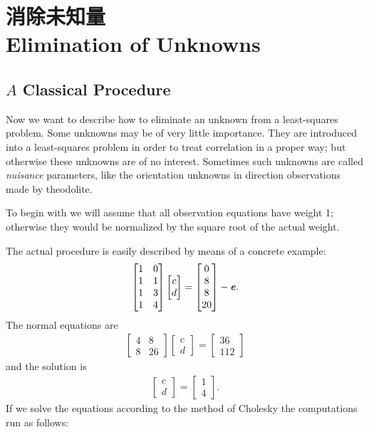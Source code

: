 \section[消除未知量]{消除未知量\\Elimination of Unknowns}
   \subsection{$A$ Classical Procedure}
   
\begin{flushleft}
	Now we want to describe how to eliminate an unknown from a least-squares problem. Some unknowns may be of very little importance. They are introduced into a least-squares problem in order to treat correlation in a proper way; but otherwise these unknowns are of no interest. Sometimes such unknowns are called \textit{nuisance} parameters, like the orientation unknowns in direction observations made by theodolite.
\end{flushleft}

  To begin with we will assume that all observation equations have weight 1; otherwise they would be normalized by the square root of the actual weight.

The actual procedure is easily described by means of a concrete example:
\begin{align}
\begin{bmatrix}
1    &    0\\
1    &    1\\
1    &    3\\
1    &    4
\end{bmatrix}
\begin{bmatrix}
c\\
d
\end{bmatrix}  = 
\begin{bmatrix}
0\\
8\\
8\\
20
\end{bmatrix}
- \textbf{\textit{e}}.
\end{align}
The normal equations are
\begin{align}
\begin{bmatrix}
4  &  8\\
8  &  26
\end{bmatrix}
\begin{bmatrix}
c\\
d
\end{bmatrix} = 
\begin{bmatrix}
36\\
112
\end{bmatrix}
\end{align}
and the solution is
\begin{align*}
\begin{bmatrix}
c\\
d
\end{bmatrix} =
\begin{bmatrix}
1\\
4
\end{bmatrix}.
\end{align*}
If we solve the equations according to the method of Cholesky the computations run as follows:

